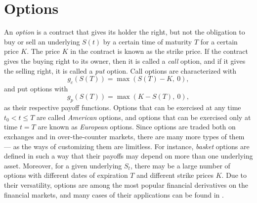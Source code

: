 \documentclass{UUThesisTemplate}
\begin{document}
\section{Options}
\label{sec:options}
\par An \emph{option} is a contract that gives its holder the right, but not the obligation to buy or sell an underlying $S(t)$ by a certain time of maturity $T$ for a certain price $K$. The price $K$ in the contract is known as the strike price. If the contract gives the buying right to its owner, then it is called a \emph{call} option, and if it gives the selling right, it is called a \emph{put} option. Call options are characterized with $$g_c(S(T))=\max(S(T)-K,\ 0),$$ and put options with $$g_p(S(T))=\max(K-S(T),\ 0),$$ as their respective payoff functions. Options that can be exercised at any time $t_0 < t \leq T$ are called \emph{American} options, and options that can be exercised only at time $t=T$ are known as \emph{European} options. Since options are traded both on exchanges and in over-the-counter markets, there are many more types of them --- as the ways of customizing them are limitless. For instance, \emph{basket} options are defined in such a way that their payoffs may depend on more than one underlying asset. Moreover, for a given underlying $S_t$, there may be a large number of options with different dates of expiration $T$ and different strike prices $K$. Due to their versatility, options are among the most popular financial derivatives on the financial markets, and many cases of their applications can be found in \cite{hull2017options}.
%
%
\end{document}
